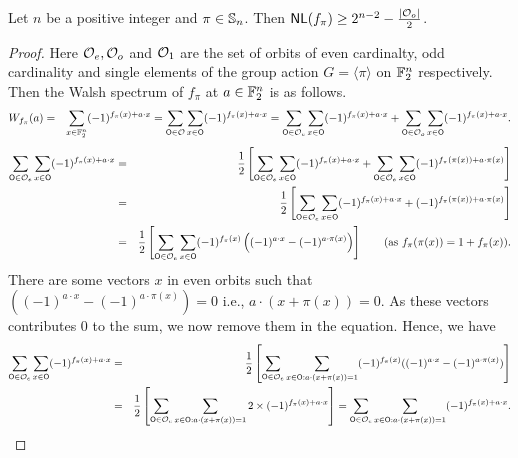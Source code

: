 \documentclass{llncs}
\begin{document}
\begin{theorem}\label{thm:nlbfpi}
Let $n$ be a positive integer and $\pi \in \mathbb{S}_n$.
Then $\mathsf{NL}(f_\pi) \ge 2^{n-2} - \frac{|\mathcal{O}_o|}{2}$.
\end{theorem}
\begin{proof}
Here $\mathcal{O}_e, \mathcal{O}_o$ and $\mathcal{O}_1$ are the set of orbits 
of even cardinalty, odd cardinality and single elements of the group action $G = \langle \pi \rangle$ on $\mathbb{F}_2^n$ respectively.
Then the Walsh spectrum of $f_\pi$ at $a \in \mathbb{F}_2^n$ is as follows.
\begin{eqnarray}\label{eqn:wspi}
W_{f_\pi}(a) & =  &\sum_{x \in \mathbb{F}_2^n} (-1)^{f_\pi(x)+a \cdot x} 
= \sum_{\mathsf{O} \in \mathcal{O}} \sum_{x \in \mathsf{O}} (-1)^{f_\pi(x)+ a \cdot x}
= \sum_{\mathsf{O} \in \mathcal{O}_e} \sum_{x \in \mathsf{O}} (-1)^{ f_\pi(x) + a \cdot x} + \sum_{\mathsf{O} \in \mathcal{O}_o} \sum_{x \in \mathsf{O}} (-1)^{ f_\pi (x) + a \cdot x}.
\end{eqnarray}
\begin{eqnarray*}
\sum_{\mathsf{O} \in \mathcal{O}_e} \sum_{x \in \mathsf{O}} (-1)^{ f_\pi(x) + a \cdot x}  
& = & \frac{1}{2} \left[ \sum_{\mathsf{O} \in \mathcal{O}_e} \sum_{x \in \mathsf{O}} (-1)^{ f_\pi(x) + a \cdot x} + \sum_{\mathsf{O} \in \mathcal{O}_e} \sum_{x \in \mathsf{O}} (-1)^{ f_\pi(\pi(x)) + a \cdot \pi(x)} \right] \\
& = & \frac{1}{2} \left[ \sum_{\mathsf{O} \in \mathcal{O}_e} \sum_{x \in \mathsf{O}} (-1)^{ f_\pi(x) + a \cdot x} + (-1)^{f_\pi(\pi(x))+ a \cdot \pi(x)}   \right]  \\
& = & \frac{1}{2} \left[ \sum_{\mathsf{O} \in \mathcal{O}_e} \sum_{x \in \mathsf{O}} (-1)^{ f_\pi(x)} \left((-1)^{a \cdot x} - (-1)^{ a \cdot \pi(x)}\right) \right]~~~~~~(\text{as }f_\pi(\pi(x)) = 1+f_\pi(x)).
\end{eqnarray*}
There are some vectors $x$ in even orbits such that $((-1)^{ a \cdot x} - (-1)^{a \cdot \pi(x)}) = 0$ i.e., $a \cdot (x + \pi(x))= 0$. As these vectors contributes $0$ to the sum, we now remove them in the equation. Hence, we have
\begin{eqnarray}\label{eqn:oddeven}
\sum_{\mathsf{O} \in \mathcal{O}_e} \sum_{x \in \mathsf{O}} (-1)^{ f_\pi(x) + a \cdot x} 
& = & \frac{1}{2} \left[ \sum_{\mathsf{O} \in \mathcal{O}_e} \sum_{x \in \mathsf{O} : a \cdot (x + \pi(x))= 1} (-1)^{f_\pi(x)} ((-1)^{ a \cdot x} - (-1)^{a \cdot \pi(x)})  \right] \nonumber\\
& = & \frac{1}{2} \left[ \sum_{\mathsf{O} \in \mathcal{O}_e} \sum_{x \in \mathsf{O} : a \cdot (x + \pi(x))= 1 } 2 \times (-1)^{f_\pi(x)+ a \cdot x}  \right] = \sum_{\mathsf{O} \in \mathcal{O}_e} \sum_{x \in \mathsf{O} : a \cdot (x + \pi(x))= 1 } (-1)^{f_\pi(x)+ a \cdot x}.
\end{eqnarray}


\end{proof}
\end{document}
